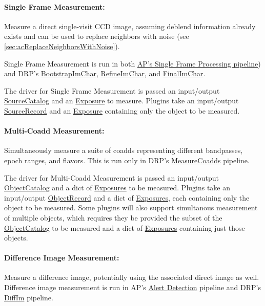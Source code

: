 \paragraph{Single Frame Measurement:} Measure a direct single-visit CCD image, assuming deblend information already exists and can be used to replace neighbors with noise (see \ref{sec:acReplaceNeighborsWithNoise}).
\label{sec:acSingleFrameMeasurement}

Single Frame Measurement is run in both \hyperref[sec:apSingleFrameProcessing]{AP's Single Frame Processing pipeline}) and DRP's \hyperref[sec:drpBootstrapImChar]{BootstrapImChar}, \hyperref[sec:drpRefineImChar]{RefineImChar}, and \hyperref[sec:drpFinalImChar]{FinalImChar}.

The driver for Single Frame Measurement is passed an input/output \hyperref[sec:spTablesSource]{SourceCatalog} and an \hyperref[sec:spImagesExposure]{Exposure} to measure.  Plugins take an input/output \hyperref[sec:spTablesSource]{SourceRecord} and an \hyperref[sec:spImagesExposure]{Exposure} containing only the object to be measured.

\paragraph{Multi-Coadd Measurement:} Simultaneously measure a suite of coadds representing different bandpasses, epoch ranges, and flavors.  This is run only in DRP's \hyperref[sec:drpMeasureCoadds]{MeasureCoadds} pipeline.
\label{sec:acMultiCoaddMeasurement}

The driver for Multi-Coadd Measurement is passed an input/output \hyperref[sec:spTablesObject]{ObjectCatalog} and a dict of \hyperref[sec:spImagesExposure]{Exposures} to be measured.  Plugins take an input/output \hyperref[sec:spTablesObject]{ObjectRecord} and a dict of \hyperref[sec:spImagesExposure]{Exposures}, each containing only the object to be measured.  Some plugins will also support simultanous measurement of multiple objects, which requires they be provided the subset of the \hyperref[sec:spTablesObject]{ObjectCatalog} to be measured and a dict of \hyperref[sec:spImagesExposure]{Exposures} containing just those objects.

\paragraph{Difference Image Measurement:} Measure a difference image, potentially using the associated direct image as well.  Difference image measurement is run in AP's \hyperref[sec:apAlertDetection]{Alert Detection} pipeline and DRP's \hyperref[sec:drpDiffIm]{DiffIm} pipeline.
\label{sec:acDiffImMeasurement}

